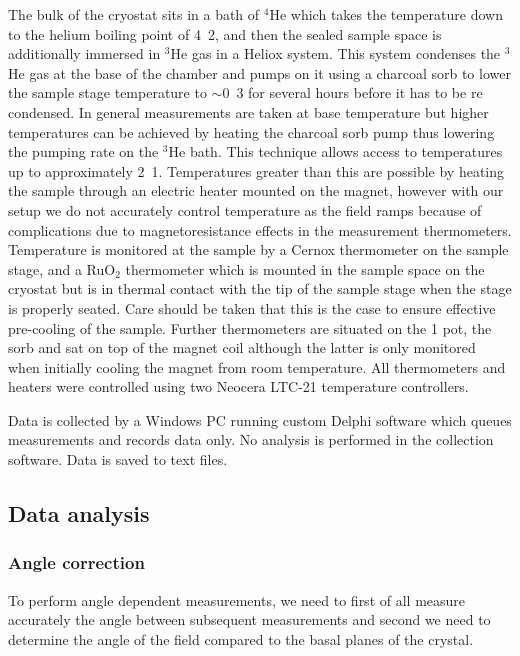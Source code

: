 The bulk of the cryostat sits in a bath of $^4$He which takes the temperature down to the helium boiling point of \unit{4.2}{\kelvin}, and then the sealed sample space is additionally immersed in $^3$He gas in a Heliox system. This system condenses the $^3$He gas at the base of the chamber and pumps on it using a charcoal sorb to lower the sample stage temperature to $\sim$\unit{0.3}{\kelvin} for several hours before it has to be re condensed. In general measurements are taken at base temperature but higher temperatures can be achieved by heating the charcoal sorb pump thus lowering the pumping rate on the $^3$He bath. This technique allows access to temperatures up to approximately \unit{2.1}{\kelvin}. Temperatures greater than this are possible by heating the sample through an electric heater mounted on the magnet, however with our setup we do not accurately control temperature as the field ramps because of complications due to magnetoresistance effects in the measurement thermometers. Temperature is monitored at the sample by a Cernox thermometer on the sample stage, and a RuO$_2$ thermometer which is mounted in the sample space on the cryostat but is in thermal contact with the tip of the sample stage when the stage is properly seated. Care should be taken that this is the case to ensure effective pre-cooling of the sample. Further thermometers are situated on the \unit{1}{\kelvin} pot, the sorb and sat on top of the magnet coil although the latter is only monitored when initially cooling the magnet from room temperature. All thermometers and heaters were controlled using two Neocera LTC-21 temperature controllers.

Data is collected by a Windows PC running custom Delphi software which queues measurements and records data only. No analysis is performed in the collection software. Data is saved to text files.

\subsection{Data analysis}

\subsubsection{Angle correction}
    \label{Sec:Exp:AngleCorrection}

To perform angle dependent measurements, we need to first of all measure accurately the angle between subsequent measurements and second we need to determine the angle of the field compared to the basal planes of the crystal. 

